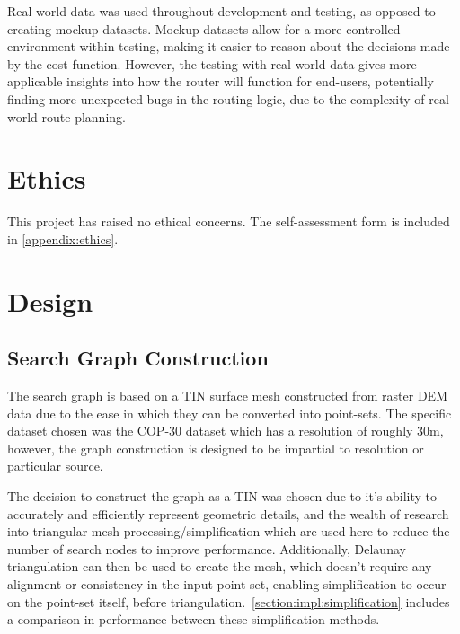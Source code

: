 \documentclass[12pt]{article}
\begin{document}
Real-world data was used throughout development and testing, as opposed to creating mockup datasets. Mockup datasets allow for a more controlled environment within testing, making it easier to reason about the decisions made by the cost function. However, the testing with real-world data gives more applicable insights into how the router will function for end-users, potentially finding more unexpected bugs in the routing logic, due to the complexity of real-world route planning.

\section{Ethics}

This project has raised no ethical concerns. The self-assessment form is included in \autoref{appendix:ethics}.

\section{Design}


\subsection{Search Graph Construction}

The search graph is based on a TIN surface mesh constructed from raster DEM data due to the ease in which they can be converted into point-sets. The specific dataset chosen was the COP-30 dataset which has a resolution of roughly 30m, however, the graph construction is designed to be impartial to resolution or particular source.

The decision to construct the graph as a TIN was chosen due to it's ability to accurately and efficiently represent geometric details, and the wealth of research into triangular mesh processing/simplification which are used here to reduce the number of search nodes to improve performance. Additionally, Delaunay triangulation can then be used to create the mesh, which doesn't require any alignment or consistency in the input point-set, enabling simplification to occur on the point-set itself, before triangulation.\ \autoref{section:impl:simplification} includes a comparison in performance between these simplification methods.
\end{document}
